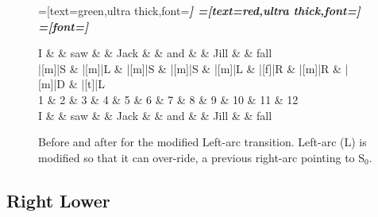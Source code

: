 \documentclass[11pt,letterpaper]{article}
\newcommand{\stacktop}{S$_0$\xspace}
\begin{document}
\begin{figure}
    \centering
    \begin{dependency}[theme=simple]
        =[text=green,ultra thick,font=\bfseries\itshape]
        =[text=red,ultra thick,font=\bfseries\itshape]
        =[font=\bfseries\itshape]

        \begin{deptext}[column sep=.1cm, row sep=.1ex]
    I \&           \& saw \&          \& Jack       \& \& and     \&           \& Jill   \&      \& fall \\
|[m]|S \& |[m]|L \& |[m]|S   \& |[m]|S \& |[m]|L \& |[f]|R \& |[m]|R \& |[m]|D \& |[t]|L    \\
            1 \&     2       \& 3  \&   4      \& 5          \& 6 \& 7     \& 8 \& 9 \& 10 \& 11 \& 12 \\
    I \&           \& saw \&          \& Jack       \& \& and     \&           \& Jill   \&      \& fall \\
        \end{deptext}

\end{dependency}
\caption{Before and after for the modified Left-arc transition.
    Left-arc (L) is modified so that it can over-ride, a previous
    right-arc pointing to \stacktop.
\label{fig:saw_fall}}
\end{figure}

\subsection{Right Lower}
\end{document}
